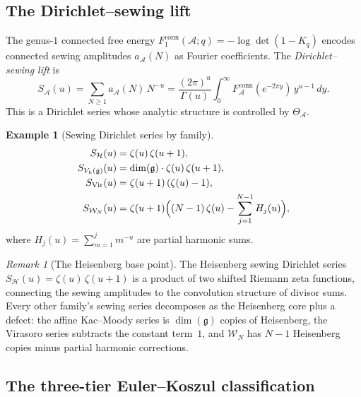 \documentclass[11pt,reqno]{amsart}
\theoremstyle{definition}
\newtheorem{example}[theorem]{Example}
\theoremstyle{remark}
\newtheorem{remark}[theorem]{Remark}
\providecommand{\cA}{\mathcal{A}}
\providecommand{\cH}{\mathcal{H}}
\providecommand{\cW}{\mathcal{W}}
\providecommand{\fg}{\mathfrak{g}}
\providecommand{\Vir}{\mathrm{Vir}}
\providecommand{\conn}{\mathrm{conn}}
\numberwithin{equation}{section}
\begin{document}
\subsection{The Dirichlet--sewing lift}

The genus-$1$ connected free energy
$F_1^{\conn}(\cA; q) = -\log\det(1 - K_q)$ encodes connected sewing
amplitudes $a_\cA(N)$ as Fourier coefficients. The
\emph{Dirichlet--sewing lift} is
\begin{equation}\label{eq:dirichlet-sewing}
  S_\cA(u)
  = \sum_{N \ge 1} a_\cA(N)\, N^{-u}
  = \frac{(2\pi)^u}{\Gamma(u)}
  \int_0^\infty F_\cA^{\conn}(e^{-2\pi y})\, y^{u-1}\, dy.
\end{equation}
This is a Dirichlet series whose analytic structure is controlled by
$\Theta_\cA$.

\begin{example}[Sewing Dirichlet series by family]
  \label{ex:sewing-dirichlet}
  \begin{align}
    S_{\cH}(u) &= \zeta(u)\,\zeta(u+1),
      \label{eq:sewing-heis} \\
    S_{V_k(\fg)}(u) &= \dim(\fg) \cdot \zeta(u)\,\zeta(u+1),
      \label{eq:sewing-km} \\
    S_{\Vir}(u) &= \zeta(u+1)\,(\zeta(u) - 1),
      \label{eq:sewing-vir} \\
    S_{\cW_N}(u) &= \zeta(u+1)\Bigl((N-1)\,\zeta(u)
      - \sum_{j=1}^{N-1} H_j(u)\Bigr),
      \label{eq:sewing-wn}
  \end{align}
  where $H_j(u) = \sum_{m=1}^j m^{-u}$ are partial harmonic sums.
\end{example}

\begin{remark}[The Heisenberg base point]\label{rem:sewing-heis}
  The Heisenberg sewing Dirichlet series
  $S_\cH(u) = \zeta(u)\,\zeta(u+1)$ is a product of two shifted
  Riemann zeta functions, connecting the sewing amplitudes to
  the convolution structure of divisor sums. Every other family's
  sewing series decomposes as the Heisenberg core plus a defect:
  the affine Kac--Moody series is $\dim(\fg)$ copies of Heisenberg,
  the Virasoro series subtracts the constant term~$1$, and $\cW_N$
  has $N-1$ Heisenberg copies minus partial harmonic corrections.
\end{remark}

\subsection{The three-tier Euler--Koszul classification}
\end{document}
